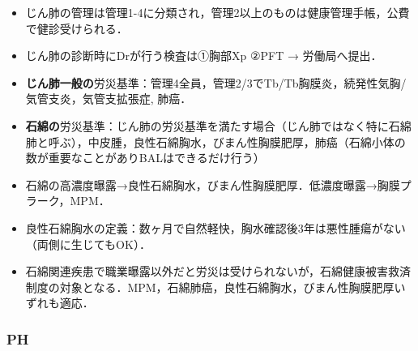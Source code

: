 \begin{itemize}
\item じん肺の管理は管理1-4に分類され，管理2以上のものは健康管理手帳，公費で健診受けられる．
\item じん肺の診断時にDrが行う検査は①胸部Xp ②PFT → 労働局へ提出．
\item \textbf{じん肺一般の}労災基準：管理4全員，管理2/3でTb/Tb胸膜炎，続発性気胸/気管支炎，気管支拡張症, 肺癌．
\item \textbf{石綿の}労災基準：じん肺の労災基準を満たす場合（じん肺ではなく特に石綿肺と呼ぶ），中皮腫，良性石綿胸水，びまん性胸膜肥厚，肺癌（石綿小体の数が重要なことがありBALはできるだけ行う）
\item 石綿の高濃度曝露→良性石綿胸水，びまん性胸膜肥厚．低濃度曝露→胸膜プラーク，MPM．
\item 良性石綿胸水の定義：数ヶ月で自然軽快，胸水確認後3年は悪性腫瘍がない（両側に生じてもOK）．
\item 石綿関連疾患で職業曝露以外だと労災は受けられないが，石綿健康被害救済制度の対象となる．MPM，石綿肺癌，良性石綿胸水，びまん性胸膜肥厚いずれも適応．
\end{itemize}


\subsubsection{PH}

